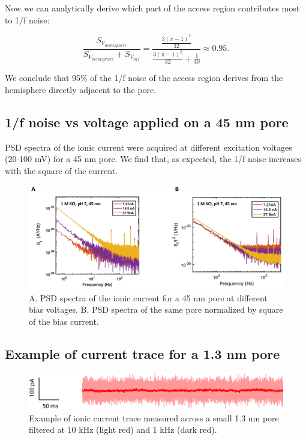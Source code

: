 \noindent Now we can analytically derive which part of the access region contributes most to 1/f noise:

\begin{equation}\label{eqn:Eq2.42}
\frac{S_{V_{hemisphere}}}{S_{V_{hemisphere}}+S_{V_{inf}}}=\frac{\frac{3(\pi-1)^2}{32}}{\frac{3(\pi-1)^2}{32}+\frac{1}{40}}\approx 0.95.
\end{equation} 



\noindent We conclude that 95\% of the 1/f noise of the access region derives from the hemisphere directly adjacent to the pore. 


\subsection{1/f noise vs voltage applied on a 45 nm pore}\label{sec:S2.4.7}


PSD spectra of the ionic current were acquired at different excitation voltages (20-100 mV) for a 45 nm pore. We find that, as expected, the 1/f noise increases with the square of the current.

\begin{figure}[!htb]
	\centering
	\includegraphics[width=\linewidth]{figures/Figure2.10.png}
	\caption{A. PSD spectra of the ionic current for a 45 nm pore at different bias voltages. B. PSD spectra of the same pore normalized by square of the bias current.}
	\label{fig:fig.2.10}
\end{figure}

\subsection{Example of current trace for a 1.3 nm pore}\label{sec:S2.4.8}

\begin{figure}[!htb]
	\centering
	\includegraphics[width=\linewidth]{figures/Figure2.11.png}
	\caption{Example of ionic current trace measured across a small 1.3 nm pore filtered at 10 kHz (light red) and 1 kHz (dark red).}
	\label{fig:fig.2.11}
\end{figure}

\renewcommand{\thefigure}{\thechapter.\arabic{figure}}
\renewcommand{\thetable}{\thechapter.\arabic{table}}
\renewcommand{\theequation}{\thechapter.\arabic{equation}}



